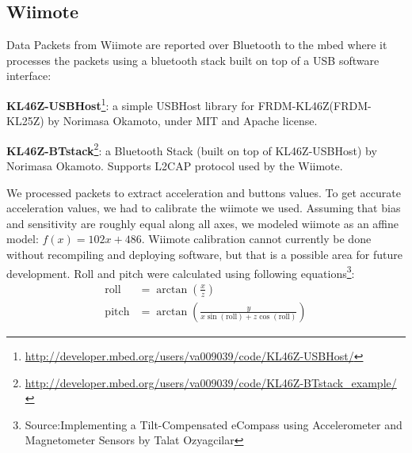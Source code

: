 \documentclass[10pt,twocolumn]{article}
\begin{document}
\subsection{Wiimote}
Data Packets from Wiimote are reported over Bluetooth to the mbed where it
processes the packets using a bluetooth stack built on top of a USB software interface:
\begin{enumerate*}
    \item
        \textbf{KL46Z-USBHost}\footnote{\url{http://developer.mbed.org/users/va009039/code/KL46Z-USBHost/}}:
a simple USBHost library for FRDM-KL46Z(FRDM-KL25Z) by Norimasa Okamoto, under MIT and Apache license.
\item
    \textbf{KL46Z-BTstack}\footnote{\url{http://developer.mbed.org/users/va009039/code/KL46Z-BTstack_example/}}:
a Bluetooth Stack (built on top of KL46Z-USBHost) by Norimasa Okamoto. Supports L2CAP protocol used by the Wiimote.
\end{enumerate*}
We processed packets to extract acceleration and buttons values. To get
accurate acceleration values, we had to calibrate the wiimote we used.
Assuming that bias and sensitivity are roughly equal along all axes, we
modeled wiimote as an affine model: $f(x) = 102x + 486 $. Wiimote calibration
cannot currently be done without recompiling and deploying software, but that
is a possible area for future development.
Roll and pitch were calculated using following equations\footnote{Source:Implementing a Tilt-Compensated eCompass using Accelerometer and Magnetometer Sensors by Talat Ozyagcilar}:
\begin{align*}
    \mathrm{roll} &= \arctan \left ( \frac{x}{z}\right)  \\
    \mathrm{pitch} &= \arctan \left (\frac{y}{x \sin(\mathrm{roll}) + z
    \cos(\mathrm{roll})}\right)
\end{align*}
\end{document}
